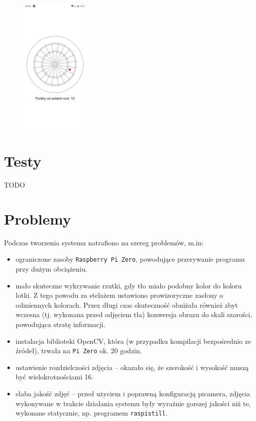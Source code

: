 \begin{figure}[h!]
\begin{center}
\includegraphics[width=0.3\textwidth]{obrazki/screenshot.png}
\end{center}
\label{screenshot}
\end{figure} 

\section{Testy}
TODO
\section{Problemy}
Podczas tworzenia systemu natrafiono na szereg problemów, m.in:
\begin{itemize}
  \item ograniczone zasoby \verb|Raspberry Pi Zero|, powodujące przerywanie programu przy dużym obciążeniu.
  \item mało skuteczne wykrywanie rzutki, gdy tło miało podobny kolor do koloru lotki. Z tego powodu za stelażem ustawiono prowizoryczne zasłony o odmiennych kolorach. Przez długi czas skuteczność obniżała również zbyt wczesna (tj. wykonana przed odjęciem tła) konwersja obrazu do skali szarości, powodująca stratę informacji.
  \item instalacja biblioteki OpenCV, która (w przypadku kompilacji bezpośrednio ze źródeł), trwała na \verb|Pi Zero| ok. 20 godzin.
  \item ustawienie rozdzielczości zdjęcia -- okazało się, że szerokość i wysokość muszą być wielokrotnościami 16.
  \item słaba jakość zdjęć -- przed użyciem i poprawną konfiguracją picamera, zdjęcia wykonywane w trakcie działania systemu były wyraźnie gorszej jakości niż te, wykonane statycznie, np. programem \verb|raspistill|.
\end{itemize}
